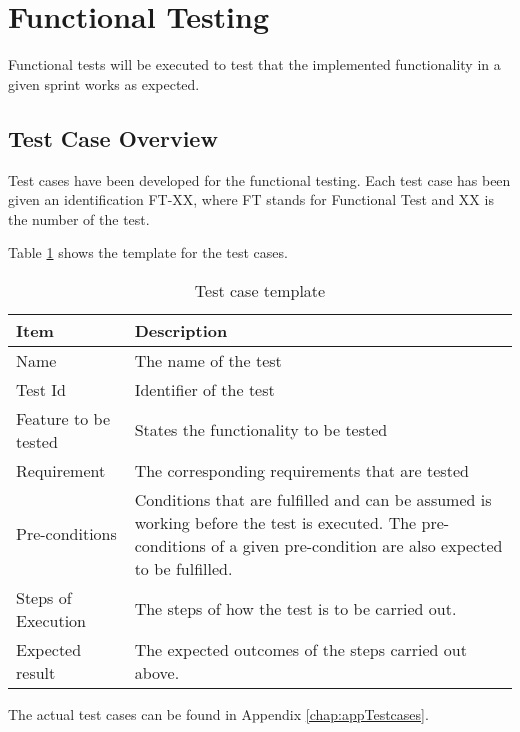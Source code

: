 \section{Functional Testing}

Functional tests will be executed to test that the implemented functionality in a given sprint works as expected.

\subsection*{Test Case Overview}

Test cases have been developed for the functional testing. Each test case has been given an identification FT-XX, where FT stands for Functional Test and XX is the number of the test.

Table \ref{table:testcasetemplate} shows the template for the test cases.


\begin{table}[H]
\centering
	\begin{tabular}{ l | p{8cm} }
		\hline
		\rowcolor{lightgray}
		{\bf Item} & {\bf Description} \\ \hline
		Name & The name of the test \\ 
		Test Id & Identifier of the test \\ 
		Feature to be tested & States the functionality to be tested \\ 
		Requirement & The corresponding requirements that are tested \\ 
		Pre-conditions & Conditions that are fulfilled and can be assumed is working before the test is executed. The pre-conditions of a given pre-condition are also expected to be fulfilled. \\ 
		Steps of Execution & The steps of how the test is to be carried out. \\ 
		Expected result & The expected outcomes of the steps carried out above. \\ 
	\end{tabular}
	\caption{Test case template}
	\label{table:testcasetemplate}
\end{table}

The actual test cases can be found in Appendix \ref{chap:appTestcases}.